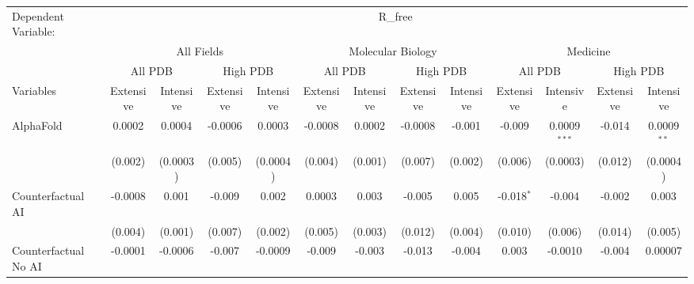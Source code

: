 \begingroup
\centering
\begin{tabular}{lcccccccccccc}
   \tabularnewline \midrule \midrule
   Dependent Variable: & \multicolumn{12}{c}{R\_free}\\
 & \multicolumn{4}{c}{All Fields} & \multicolumn{4}{c}{Molecular Biology} & \multicolumn{4}{c}{Medicine} \\
\cmidrule(lr){2-5} \cmidrule(lr){6-9} \cmidrule(lr){10-13}
 & \multicolumn{2}{c}{All PDB} & \multicolumn{2}{c}{High PDB} & \multicolumn{2}{c}{All PDB} & \multicolumn{2}{c}{High PDB} & \multicolumn{2}{c}{All PDB} & \multicolumn{2}{c}{High PDB} \\
\cmidrule(lr){2-3} \cmidrule(lr){4-5} \cmidrule(lr){6-7} \cmidrule(lr){8-9} \cmidrule(lr){10-11} \cmidrule(lr){12-13}
Variables & \multicolumn{1}{c}{Extensive} & \multicolumn{1}{c}{Intensive} & \multicolumn{1}{c}{Extensive} & \multicolumn{1}{c}{Intensive} & \multicolumn{1}{c}{Extensive} & \multicolumn{1}{c}{Intensive} & \multicolumn{1}{c}{Extensive} & \multicolumn{1}{c}{Intensive} & \multicolumn{1}{c}{Extensive} & \multicolumn{1}{c}{Intensive} & \multicolumn{1}{c}{Extensive} & \multicolumn{1}{c}{Intensive} \\
\cmidrule(lr){1-1}\cmidrule(lr){2-2} \cmidrule(lr){3-3} \cmidrule(lr){4-4} \cmidrule(lr){5-5} \cmidrule(lr){6-6} \cmidrule(lr){7-7} \cmidrule(lr){8-8} \cmidrule(lr){9-9} \cmidrule(lr){10-10} \cmidrule(lr){11-11} \cmidrule(lr){12-12} \cmidrule(lr){13-13}
   AlphaFold                                & 0.0002  & 0.0004        & -0.0006 & 0.0003   & -0.0008 & 0.0002  & -0.0008     & -0.001      & -0.009       & 0.0009$^{***}$ & -0.014  & 0.0009$^{**}$\\   
                                            & (0.002) & (0.0003)      & (0.005) & (0.0004) & (0.004) & (0.001) & (0.007)     & (0.002)     & (0.006)      & (0.0003)       & (0.012) & (0.0004)\\   
   Counterfactual AI                        & -0.0008 & 0.001         & -0.009  & 0.002    & 0.0003  & 0.003   & -0.005      & 0.005       & -0.018$^{*}$ & -0.004         & -0.002  & 0.003\\   
                                            & (0.004) & (0.001)       & (0.007) & (0.002)  & (0.005) & (0.003) & (0.012)     & (0.004)     & (0.010)      & (0.006)        & (0.014) & (0.005)\\   
   Counterfactual No AI                     & -0.0001 & -0.0006       & -0.007  & -0.0009  & -0.009  & -0.003  & -0.013      & -0.004      & 0.003        & -0.0010        & -0.004  & 0.00007\\   

\end{tabular}
